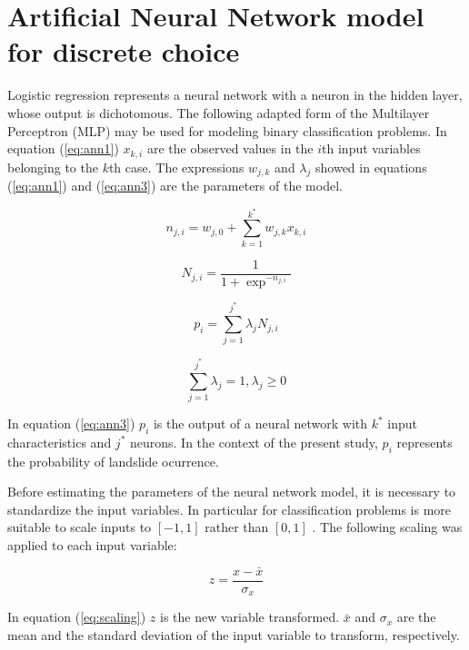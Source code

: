 \documentclass[11pt,twoside]{rmta2010eng}%
\begin{document}
\section{Artificial Neural Network model for discrete choice}
Logistic regression represents a neural network with 
a neuron in the hidden layer, whose output is dichotomous. The following adapted form of the Multilayer Perceptron (MLP) may be used for modeling binary classification problems. In equation (\ref{eq:ann1}) $x_{k,i}$ are the observed values in the $i$th input variables belonging to the $k$th case. The expressions $w_{j,k}$ and $\lambda_{j}$ showed in equations (\ref{eq:ann1}) and (\ref{eq:ann3}) are the parameters of the model. 


\begin{equation}
n_{j,i} = w_{j,0} + \sum_{k=1}^{k^{*}} w_{j,k}x_{k,i}
\label{eq:ann1}
\end{equation}

\begin{equation}
N_{j,i} = \frac{1}{1+\exp^{-n_{j,i}}}
\label{eq:ann2}
\end{equation}



\begin{equation}
p_{i} = \sum_{j=1}^{j^{*}} \lambda_{j} N_{j,i}
\label{eq:ann3}
\end{equation}

\begin{equation}
\sum_{j=1}^{j^{*}} \lambda_{j} = 1 , \lambda_{j} \ge 0
\label{eq:ann4}
\end{equation}


In equation (\ref{eq:ann3}) $p_{i}$ is the output of a neural network with $ k^{*} $ input characteristics and $ j^{*} $ neurons. In the context of the present study, $p_{i} $ represents the probability of landslide ocurrence.

Before estimating the parameters of the neural network model, it is necessary to standardize the input variables. In particular for classification problems is more suitable to scale inputs to $[-1,1]$ rather than $[0,1]$ \cite{FAQANN}. The following scaling was applied to each input variable: 

\begin{equation}
z = \frac{x - \bar{x} }{\sigma_{x}}
\label{eq:scaling}
\end{equation}

In equation (\ref{eq:scaling}) $z$ is the new variable transformed. $ \bar{x} $ and $\sigma_{x}$ are the mean and the standard deviation of the input variable to transform, respectively.  
\end{document}
